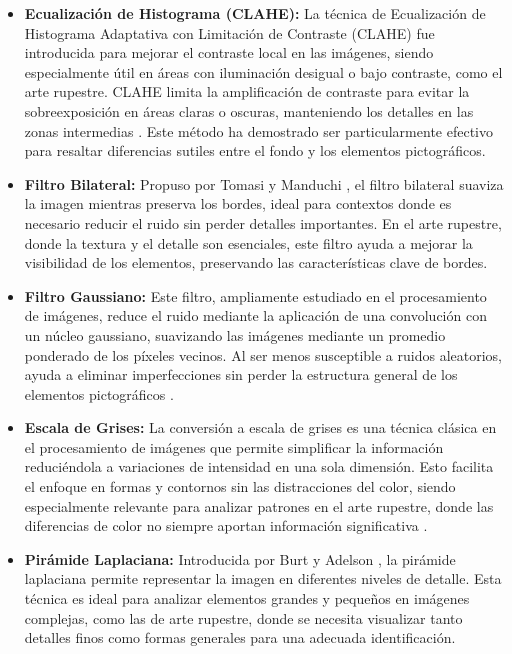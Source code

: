 \begin{itemize}
    \item \textbf{Ecualización de Histograma (CLAHE):}
    La técnica de Ecualización de Histograma Adaptativa con Limitación de Contraste (CLAHE) fue introducida para mejorar el contraste local en las imágenes, siendo especialmente útil en áreas con iluminación desigual o bajo contraste, como el arte rupestre.
    CLAHE limita la amplificación de contraste para evitar la sobreexposición en áreas claras o oscuras, manteniendo los detalles en las zonas intermedias \cite{zuiderveld1994contrast}.
    Este método ha demostrado ser particularmente efectivo para resaltar diferencias sutiles entre el fondo y los elementos pictográficos.

    \item \textbf{Filtro Bilateral:}
    Propuso por Tomasi y Manduchi \cite{tomasi1998bilateral}, el filtro bilateral suaviza la imagen mientras preserva los bordes, ideal para contextos donde es necesario reducir el ruido sin perder detalles importantes.
    En el arte rupestre, donde la textura y el detalle son esenciales, este filtro ayuda a mejorar la visibilidad de los elementos, preservando las características clave de bordes.

    \item \textbf{Filtro Gaussiano:}
    Este filtro, ampliamente estudiado en el procesamiento de imágenes, reduce el ruido mediante la aplicación de una convolución con un núcleo gaussiano, suavizando las imágenes mediante un promedio ponderado de los píxeles vecinos.
    Al ser menos susceptible a ruidos aleatorios, ayuda a eliminar imperfecciones sin perder la estructura general de los elementos pictográficos \cite{gonzalesWood}.

    \item \textbf{Escala de Grises:}
    La conversión a escala de grises es una técnica clásica en el procesamiento de imágenes que permite simplificar la información reduciéndola a variaciones de intensidad en una sola dimensión.
    Esto facilita el enfoque en formas y contornos sin las distracciones del color, siendo especialmente relevante para analizar patrones en el arte rupestre, donde las diferencias de color no siempre aportan información significativa \cite{gonzalesWood}.

    \item \textbf{Pirámide Laplaciana:}
    Introducida por Burt y Adelson \cite{burt1983laplacian}, la pirámide laplaciana permite representar la imagen en diferentes niveles de detalle.
    Esta técnica es ideal para analizar elementos grandes y pequeños en imágenes complejas, como las de arte rupestre, donde se necesita visualizar tanto detalles finos como formas generales para una adecuada identificación.


\end{itemize}
